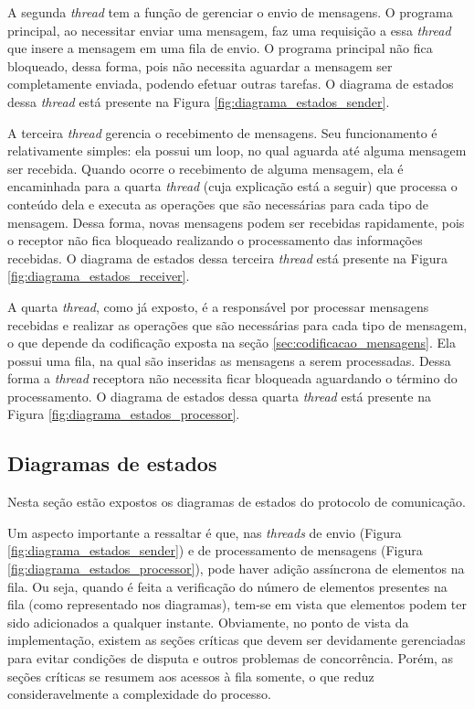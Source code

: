 A segunda \textit{thread} tem a função de gerenciar o envio de mensagens. O programa principal, ao necessitar enviar uma mensagem, faz uma requisição a essa \textit{thread} que insere a mensagem em uma fila de envio. O programa principal não fica bloqueado, dessa forma, pois não necessita aguardar a mensagem ser completamente enviada, podendo efetuar outras tarefas. O diagrama de estados dessa \textit{thread} está presente na Figura \ref{fig:diagrama_estados_sender}.

A terceira \textit{thread} gerencia o recebimento de mensagens. Seu funcionamento é relativamente simples: ela possui um loop, no qual aguarda até alguma mensagem ser recebida. Quando ocorre o recebimento de alguma mensagem, ela é encaminhada para a quarta \textit{thread} (cuja explicação está a seguir) que processa o conteúdo dela e executa as operações que são necessárias para cada tipo de mensagem. Dessa forma, novas mensagens podem ser recebidas rapidamente, pois o receptor não fica bloqueado realizando o processamento das informações recebidas. O diagrama de estados dessa terceira \textit{thread} está presente na Figura \ref{fig:diagrama_estados_receiver}.

A quarta \textit{thread}, como já exposto, é a responsável por processar mensagens recebidas e realizar as operações que são necessárias para cada tipo de mensagem, o que depende da codificação exposta na seção \ref{sec:codificacao_mensagens}. Ela possui uma fila, na qual são inseridas as mensagens a serem processadas. Dessa forma a \textit{thread} receptora não necessita ficar bloqueada aguardando o término do processamento. O diagrama de estados dessa quarta \textit{thread} está presente na Figura \ref{fig:diagrama_estados_processor}.




\subsection{Diagramas de estados}

Nesta seção estão expostos os diagramas de estados do protocolo de comunicação.


Um aspecto importante a ressaltar é que, nas \textit{threads} de envio (Figura \ref{fig:diagrama_estados_sender}) e de processamento de mensagens (Figura \ref{fig:diagrama_estados_processor}), pode haver adição assíncrona de elementos na fila. Ou seja, quando é feita a verificação do número de elementos presentes na fila (como representado nos diagramas), tem-se em vista que elementos podem ter sido adicionados a qualquer instante. Obviamente, no ponto de vista da implementação, existem as seções críticas que devem ser devidamente gerenciadas para evitar condições de disputa e outros problemas de concorrência. Porém, as seções críticas se resumem aos acessos à fila somente, o que reduz consideravelmente a complexidade do processo.

